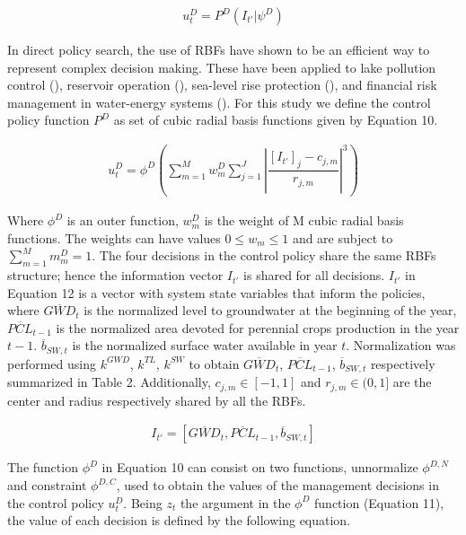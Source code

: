 \documentclass[11pt,a4paper]{article}
\begin{document}
\begin{align}
u_{t}^D = P^{D}(I_{t'}|\psi^{D})
\end{align}

In direct policy search, the use of RBFs have shown to be an efficient way to represent complex decision making. These have been applied to lake pollution control (\cite{quinn_direct_2017}), reservoir operation (\cite{giuliani_universal_2014, zatarain_salazar_balancing_2017}), sea-level rise protection (\cite{garner_using_2018}), and financial risk management in water-energy systems (\cite{gupta_can_2020,hamilton_stream_2022}). For this study we define the control policy function $P^D$ as set of cubic radial basis functions given by Equation 10.

\begin{align}
u_{t}^D = \phi^{D}\left(\sum_{m=1}^M w_{m}^D \sum_{j=1}^J \left\lvert\dfrac{[I_{t'}]_{j}-c_{j,m}}{r_{j,m}}\right\rvert^{3}\right)
\end{align}

Where $\phi^{D}$ is an outer function, $w_{m}^D$ is the weight of M cubic radial basis functions. The weights can have values $ 0 \leq w_{m} \leq 1$ and are subject to $\sum_{m=1}^M m_{m}^D= 1$. The four decisions in the control policy share the same RBFs structure; hence the information vector $I_{t'}$ is shared for all decisions. $I_{t'}$ in Equation 12 is a vector with system state variables that inform the policies, where $\overline{GWD}_{t}$ is the normalized level to groundwater at the beginning of the year, $\overline{PCL}_{t-1}$ is the normalized area devoted for perennial crops production in the year $t-1$. $\overline{b}_{SW,t}$ is the normalized surface water available in year $t$. Normalization was performed using $k^{GWD}$, $k^{TL}$, $k^{SW}$ to obtain $\overline{GWD}_{t}$, $\overline{PCL}_{t-1}$, $\overline{b}_{SW,t}$ respectively summarized in Table 2. Additionally, $c_{j,m} \in [-1,1]$ and $r_{j,m} \in (0,1]$ are the center and radius respectively shared by all the RBFs.

\begin{align}
I_{t'} = [\overline{GWD}_{t},\overline{PCL}_{t-1},\overline{b}_{SW,t}]
\end{align}

The function $\phi^{D}$ in Equation 10 can consist on two functions, unnormalize $\phi^{D,N}$ and constraint $\phi^{D,C}$, used to obtain the values of the management decisions in the control policy $u_{t}^D$. Being $z_{t}$ the argument in the $\phi^{D}$ function (Equation 11), the value of each decision is defined by the following equation.
\end{document}
